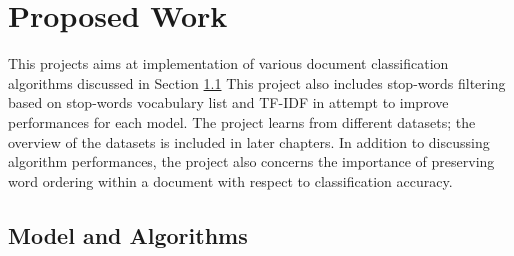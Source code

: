 \documentclass[a4paper, 11pt]{article}
\begin{document}
	\section{Proposed Work}
	This projects aims at implementation of various document classification algorithms discussed in Section \ref{model}
	This project also includes stop-words filtering based on stop-words vocabulary list and TF-IDF in attempt to improve performances for each model. The project learns from different datasets; the overview of the datasets is included in later chapters. In addition to discussing algorithm performances, the project also concerns the importance of preserving word ordering within a document with respect to classification accuracy. 
	\subsection{Model and Algorithms}\label{model}
\end{document}
